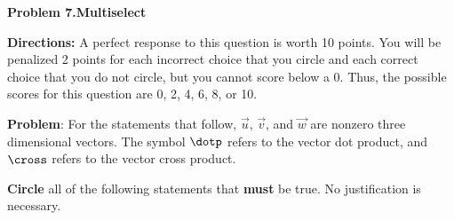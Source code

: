 \documentclass{ximera}
\begin{document}
\textbf{Problem 7.}\textbf{Multiselect}

\vspace{3mm}

\textbf{Directions:} A perfect response to this question is worth 10 points.  You will be penalized 2 points for each incorrect choice that you circle and each correct choice that you do not circle, but you cannot score below a 0.  Thus, the possible scores for this question are 0, 2, 4, 6, 8, or 10.  

\vspace{3mm}


\textbf{Problem}:  For the statements that follow, $\vec{u}$, $\vec{v}$, and $\vec{w}$ are nonzero three dimensional vectors.  The symbol $\dotp$ refers to the vector dot product, and $\cross$ refers to the vector cross product.  

\vspace{3mm}

\textbf{Circle} all of the following statements that \textbf{must} be true.  No justification is necessary.
\end{document}
